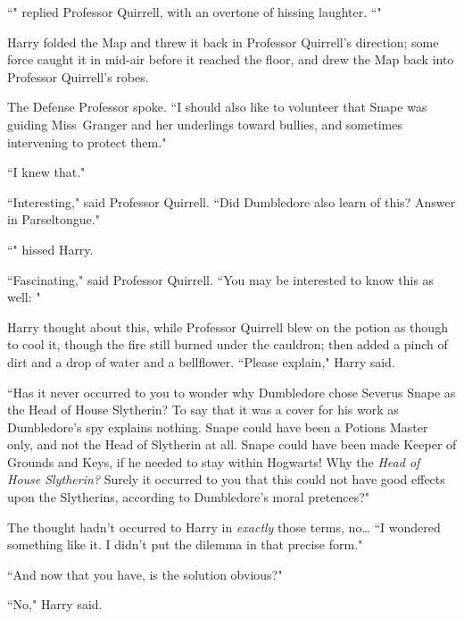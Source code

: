 ``" replied Professor Quirrell, with an overtone of hissing laughter. ``"

Harry folded the Map and threw it back in Professor Quirrell's direction; some force caught it in mid-air before it reached the floor, and drew the Map back into Professor Quirrell's robes.

The Defense Professor spoke. ``I should also like to volunteer that Snape was guiding Miss~Granger and her underlings toward bullies, and sometimes intervening to protect them."

``I knew that."

``Interesting," said Professor Quirrell. ``Did Dumbledore also learn of this? Answer in Parseltongue."

``" hissed Harry.

``Fascinating," said Professor Quirrell. ``You may be interested to know this as well: "

Harry thought about this, while Professor Quirrell blew on the potion as though to cool it, though the fire still burned under the cauldron; then added a pinch of dirt and a drop of water and a bellflower. ``Please explain," Harry said.

``Has it never occurred to you to wonder why Dumbledore chose Severus Snape as the Head of House Slytherin? To say that it was a cover for his work as Dumbledore's spy explains nothing. Snape could have been a Potions Master only, and not the Head of Slytherin at all. Snape could have been made Keeper of Grounds and Keys, if he needed to stay within Hogwarts! Why the \emph{Head of House Slytherin?} Surely it occurred to you that this could not have good effects upon the Slytherins, according to Dumbledore's moral pretences?"

The thought hadn't occurred to Harry in \emph{exactly} those terms, no{\ldots} ``I wondered something like it. I didn't put the dilemma in that precise form."

``And now that you have, is the solution obvious?"

``No," Harry said.

